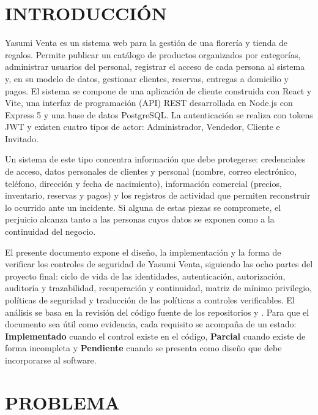 \documentclass[12pt,letterpaper]{article}
\newcommand{\Si}{\textcolor{green!40!black}{\textbf{Implementado}}}
\newcommand{\Pa}{\textcolor{orange!80!black}{\textbf{Parcial}}}
\newcommand{\No}{\textcolor{red!70!black}{\textbf{Pendiente}}}
\newcommand{\cod}[1]{\path{#1}}
\begin{document}

\renewcommand{\contentsname}{ÍNDICE}
\tableofcontents
\clearpage
\section{INTRODUCCIÓN}

Yasumi Venta es un sistema web para la gestión de una florería y tienda de regalos. Permite publicar un catálogo de productos organizados por categorías, administrar usuarios del personal, registrar el acceso de cada persona al sistema y, en su modelo de datos, gestionar clientes, reservas, entregas a domicilio y pagos. El sistema se compone de una aplicación de cliente construida con React y Vite, una interfaz de programación (API) REST desarrollada en Node.js con Express 5 y una base de datos PostgreSQL. La autenticación se realiza con tokens JWT y existen cuatro tipos de actor: Administrador, Vendedor, Cliente e Invitado.

Un sistema de este tipo concentra información que debe protegerse: credenciales de acceso, datos personales de clientes y personal (nombre, correo electrónico, teléfono, dirección y fecha de nacimiento), información comercial (precios, inventario, reservas y pagos) y los registros de actividad que permiten reconstruir lo ocurrido ante un incidente. Si alguna de estas piezas se compromete, el perjuicio alcanza tanto a las personas cuyos datos se exponen como a la continuidad del negocio.

El presente documento expone el diseño, la implementación y la forma de verificar los controles de seguridad de Yasumi Venta, siguiendo las ocho partes del proyecto final: ciclo de vida de las identidades, autenticación, autorización, auditoría y trazabilidad, recuperación y continuidad, matriz de mínimo privilegio, políticas de seguridad y traducción de las políticas a controles verificables. El análisis se basa en la revisión del código fuente de los repositorios \cod{G3rC0/back-seguridad} y \cod{G3rC0/front-seguridad}. Para que el documento sea útil como evidencia, cada requisito se acompaña de un estado: \Si{} cuando el control existe en el código, \Pa{} cuando existe de forma incompleta y \No{} cuando se presenta como diseño que debe incorporarse al software.

\section{PROBLEMA}
\end{document}

